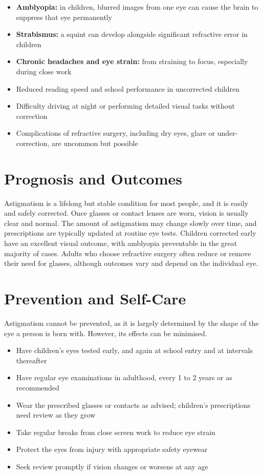 \begin{itemize}
    \item \textbf{Amblyopia:} in children, blurred images from one eye can cause the brain to suppress that eye permanently
    \item \textbf{Strabismus:} a squint can develop alongside significant refractive error in children
    \item \textbf{Chronic headaches and eye strain:} from straining to focus, especially during close work
    \item Reduced reading speed and school performance in uncorrected children
    \item Difficulty driving at night or performing detailed visual tasks without correction
    \item Complications of refractive surgery, including dry eyes, glare or under-correction, are uncommon but possible
\end{itemize}

\section*{Prognosis and Outcomes}
Astigmatism is a lifelong but stable condition for most people, and it is easily and safely corrected. Once glasses or contact lenses are worn, vision is usually clear and normal. The amount of astigmatism may change slowly over time, and prescriptions are typically updated at routine eye tests. Children corrected early have an excellent visual outcome, with amblyopia preventable in the great majority of cases. Adults who choose refractive surgery often reduce or remove their need for glasses, although outcomes vary and depend on the individual eye.

\section*{Prevention and Self-Care}
Astigmatism cannot be prevented, as it is largely determined by the shape of the eye a person is born with. However, its effects can be minimised.

\begin{itemize}
    \item Have children's eyes tested early, and again at school entry and at intervals thereafter
    \item Have regular eye examinations in adulthood, every 1 to 2 years or as recommended
    \item Wear the prescribed glasses or contacts as advised; children's prescriptions need review as they grow
    \item Take regular breaks from close screen work to reduce eye strain
    \item Protect the eyes from injury with appropriate safety eyewear
    \item Seek review promptly if vision changes or worsens at any age
\end{itemize}

